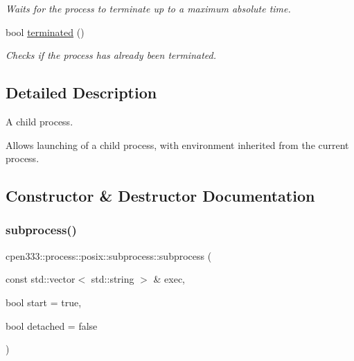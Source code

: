\begin{DoxyCompactItemize}
\begin{DoxyCompactList}\small\item\em Waits for the process to terminate up to a maximum absolute time. \end{DoxyCompactList}\item 
bool \hyperlink{classcpen333_1_1process_1_1posix_1_1subprocess_aabc5ed98ead25bc40663e586a83e62bb}{terminated} ()
\begin{DoxyCompactList}\small\item\em Checks if the process has already been terminated. \end{DoxyCompactList}\end{DoxyCompactItemize}


\subsection{Detailed Description}
A child process. 

Allows launching of a child process, with environment inherited from the current process. 

\subsection{Constructor \& Destructor Documentation}
\mbox{\label{classcpen333_1_1process_1_1posix_1_1subprocess_a427822d8d77afa1014a0d10a5f50aa14}} 
\subsubsection{\texorpdfstring{subprocess()}{subprocess()}}
{\footnotesize\ttfamily cpen333\+::process\+::posix\+::subprocess\+::subprocess (\begin{DoxyParamCaption}\item[{const std\+::vector$<$ std\+::string $>$ \&}]{exec,  }\item[{bool}]{start = {\ttfamily true},  }\item[{bool}]{detached = {\ttfamily false} }\end{DoxyParamCaption})\hspace{0.3cm}{\ttfamily [inline]}}



